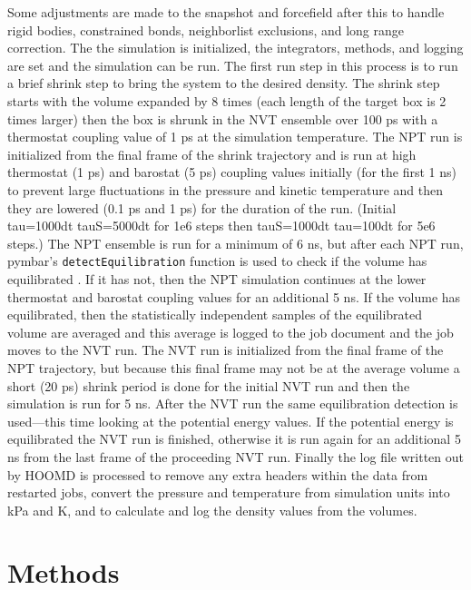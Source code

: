 Some adjustments are made to the snapshot and forcefield after this to handle rigid bodies, constrained bonds, neighborlist exclusions, and long range correction. The the simulation is initialized, the integrators, methods, and logging are set and the simulation can be run. The first run step in this process is to run a brief shrink step to bring the system to the desired density. The shrink step starts with the volume expanded by 8 times (each length of the target box is 2 times larger) then the box is shrunk in the NVT ensemble over 100 ps with a thermostat coupling value of 1 ps at the simulation temperature. The NPT run is initialized from the final frame of the shrink trajectory and is run at high thermostat (1 ps) and barostat (5 ps) coupling values initially (for the first 1 ns) to prevent large fluctuations in the pressure and kinetic temperature and then they are lowered (0.1 ps and 1 ps) for the duration of the run. (Initial tau=1000dt tauS=5000dt for 1e6 steps then tauS=1000dt tau=100dt for 5e6 steps.) The NPT ensemble is run for a minimum of 6 ns, but after each NPT run, pymbar's \lstinline{detectEquilibration} function is used to check if the volume has equilibrated \cite{Chodera2007, Chodera2016, Shirts2008a}. If it has not, then the NPT simulation continues at the lower thermostat and barostat coupling values for an additional 5 ns. If the volume has equilibrated, then the statistically independent samples of the equilibrated volume are averaged and this average is logged to the job document and the job moves to the NVT run. The NVT run is initialized from the final frame of the NPT trajectory, but because this final frame may not be at the average volume a short (20 ps) shrink period is done for the initial NVT run and then the simulation is run for 5 ns. After the NVT run the same equilibration detection is used---this time looking at the potential energy values. If the potential energy is equilibrated the NVT run is finished, otherwise it is run again for an additional 5 ns from the last frame of the proceeding NVT run. Finally the log file written out by HOOMD is processed to remove any extra headers within the data from restarted jobs, convert the pressure and temperature from simulation units into kPa and K, and to calculate and log the density values from the volumes.

\section{Methods}

